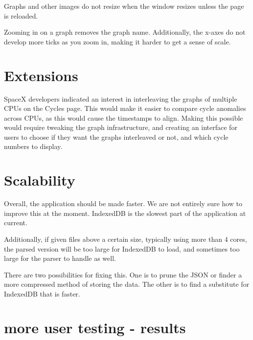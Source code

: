 \documentclass{hmcclinic}
\begin{document}
Graphs and other images do not resize when the window resizes unless the page
is reloaded.

Zooming in on a graph removes the graph name. Additionally, the x-axes do not
develop more ticks as you zoom in, making it harder to get a sense of scale.

\section{Extensions}
  SpaceX developers indicated an interest in interleaving the graphs of multiple
  CPUs on the Cycles page.  This would make it easier to compare cycle
  anomalies across CPUs, as this would cause the timestamps to align. Making
  this possible would require tweaking the graph infrastructure, and creating an
  interface for users to choose if they want the graphs interleaved or not, and
  which cycle numbers to display.
\section{Scalability}
  Overall, the application should be made faster. We are not entirely sure how
  to improve this at the moment. IndexedDB is the slowest part of the
  application at current.

Additionally, if given files above a certain size, typically using more than 4
cores, the parsed version will be too large for IndexedDB to load, and
sometimes too large for the parser to handle as well.

There are two possibilities for fixing this. One is to prune the JSON or
finder a more compressed method of storing the data. The other is to find a
substitute for IndexedDB that is faster.
\section{more user testing - results}
\end{document}
